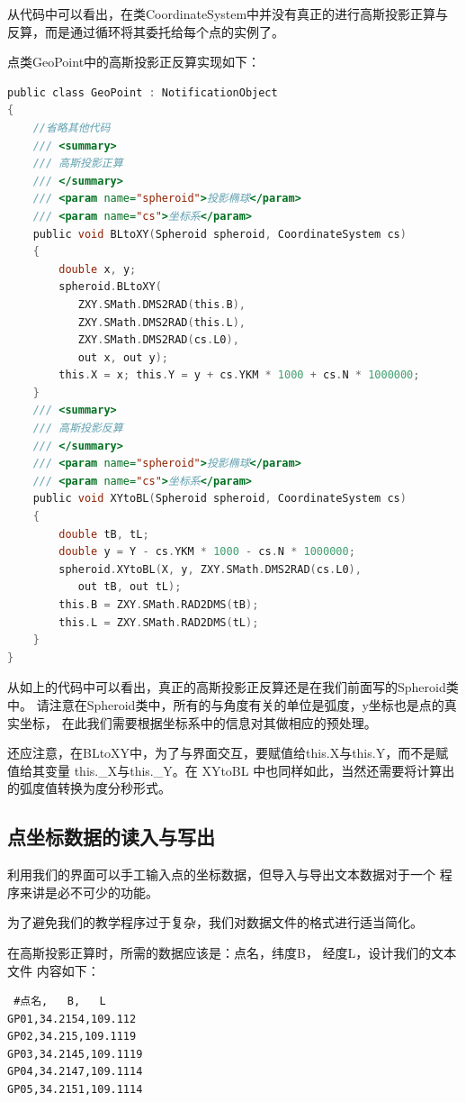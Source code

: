 从代码中可以看出，在类CoordinateSystem中并没有真正的进行高斯投影正算与
反算，而是通过循环将其委托给每个点的实例了。

点类GeoPoint中的高斯投影正反算实现如下：

\begin{lstlisting}[language=C]
public class GeoPoint : NotificationObject
{
    //省略其他代码
    /// <summary>
    /// 高斯投影正算
    /// </summary>
    /// <param name="spheroid">投影椭球</param>
    /// <param name="cs">坐标系</param>
    public void BLtoXY(Spheroid spheroid, CoordinateSystem cs)
    {
        double x, y;
        spheroid.BLtoXY(
           ZXY.SMath.DMS2RAD(this.B),
           ZXY.SMath.DMS2RAD(this.L),
           ZXY.SMath.DMS2RAD(cs.L0),
           out x, out y);
        this.X = x; this.Y = y + cs.YKM * 1000 + cs.N * 1000000;
    }
    /// <summary>
    /// 高斯投影反算
    /// </summary>
    /// <param name="spheroid">投影椭球</param>
    /// <param name="cs">坐标系</param>
    public void XYtoBL(Spheroid spheroid, CoordinateSystem cs)
    {
        double tB, tL;
        double y = Y - cs.YKM * 1000 - cs.N * 1000000;
        spheroid.XYtoBL(X, y, ZXY.SMath.DMS2RAD(cs.L0),
           out tB, out tL);
        this.B = ZXY.SMath.RAD2DMS(tB);
        this.L = ZXY.SMath.RAD2DMS(tL);
    }
}
\end{lstlisting}

从如上的代码中可以看出，真正的高斯投影正反算还是在我们前面写的Spheroid类中。
请注意在Spheroid类中，所有的与角度有关的单位是弧度，y坐标也是点的真实坐标，
在此我们需要根据坐标系中的信息对其做相应的预处理。

还应注意，在BLtoXY中，为了与界面交互，要赋值给this.X与this.Y，而不是赋值给其变量
this.\_X与this.\_Y。在 XYtoBL 中也同样如此，当然还需要将计算出的弧度值转换为度分秒形式。

\subsection{点坐标数据的读入与写出}

利用我们的界面可以手工输入点的坐标数据，但导入与导出文本数据对于一个
程序来讲是必不可少的功能。

为了避免我们的教学程序过于复杂，我们对数据文件的格式进行适当简化。

在高斯投影正算时，所需的数据应该是：点名，纬度B， 经度L，设计我们的文本文件
内容如下：

\begin{verbatim}
 #点名,   B,   L
GP01,34.2154,109.112
GP02,34.215,109.1119
GP03,34.2145,109.1119
GP04,34.2147,109.1114
GP05,34.2151,109.1114
\end{verbatim}

